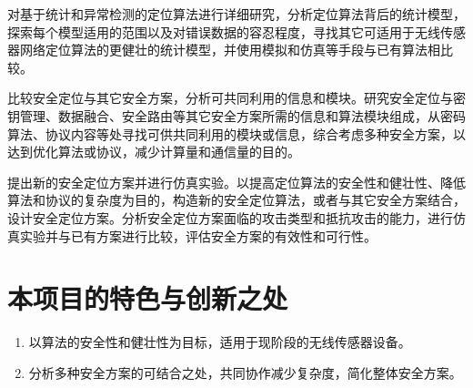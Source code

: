 \documentclass[a4paper,10pt]{article}
\begin{document}
对基于统计和异常检测的定位算法进行详细研究，分析定位算法背后的统计模型，探索每个模型适用的范围以及对错误数据的容忍程度，寻找其它可适用于无线传感器网络定位算法的更健壮的统计模型，并使用模拟和仿真等手段与已有算法相比较。

比较安全定位与其它安全方案，分析可共同利用的信息和模块。研究安全定位与密钥管理、数据融合、安全路由等其它安全方案所需的信息和算法模块组成，从密码算法、协议内容等处寻找可供共同利用的模块或信息，综合考虑多种安全方案，以达到优化算法或协议，减少计算量和通信量的目的。

提出新的安全定位方案并进行仿真实验。以提高定位算法的安全性和健壮性、降低算法和协议的复杂度为目的，构造新的安全定位算法，或者与其它安全方案结合，设计安全定位方案。分析安全定位方案面临的攻击类型和抵抗攻击的能力，进行仿真实验并与已有方案进行比较，评估安全方案的有效性和可行性。

\section{本项目的特色与创新之处} 

\begin{enumerate}
\item 以算法的安全性和健壮性为目标，适用于现阶段的无线传感器设备。
\item 分析多种安全方案的可结合之处，共同协作减少复杂度，简化整体安全方案。
\end{enumerate}



\end{document}
